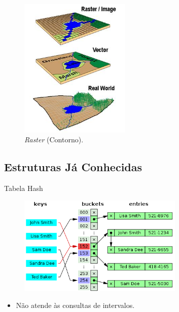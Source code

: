 \documentclass[red, tikz, aspectratio=169, xcolor=dvipsnames]{beamer}
\let\olditem=\item%
\renewcommand{\item}{\olditem \justifying}
\begin{document}
	
		\begin{frame}
			\vspace{-10px}
			\begin{figure}
				\centering
				\includegraphics[width=0.47\textwidth]{img/spatial.jpg}
				\caption{\textit{Raster} (Contorno).}
			\end{figure}
		\end{frame}


	\subsection{Estruturas Já Conhecidas}
	
		\begin{frame}{Tabela Hash}
			\begin{figure}
				\centering
				\includegraphics[width=0.7\textwidth]{img/hash.png}
			\end{figure}
			\begin{itemize}
				\item Não atende às consultas de intervalos.
			\end{itemize}
		\end{frame}
		
\end{document}
